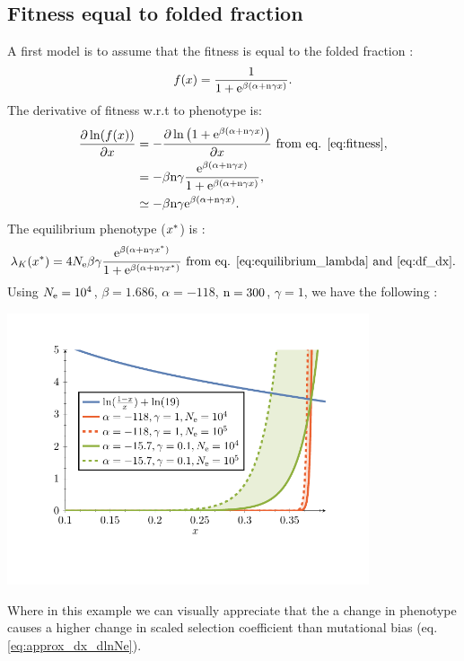 \documentclass{article}
\begin{document}
\subsection{Fitness equal to folded fraction}
A first model is to assume that the fitness is equal to the folded fraction \cite{Goldstein2013}:
\begin{gather}
f(x) = \frac{1}{1 + \mathrm{e}^{\beta(\alpha + \text{n} \gamma x)}}. \label{eq:fitness}
\end{gather}
The derivative of fitness w.r.t to phenotype is:
\begin{align}
\frac{\partial \ln (f(x))}{\partial x}  & = - \frac{\partial \ln \left( 1 + \mathrm{e}^{\beta(\alpha + \text{n} \gamma x)} \right)}{\partial x} \text{ from eq. \ref{eq:fitness}}, \\
& = - \beta \text{n} \gamma \frac{\mathrm{e}^{\beta(\alpha + \text{n} \gamma x)}}{1 + \mathrm{e}^{\beta(\alpha + \text{n} \gamma x)}} \label{eq:df_dx},\\
& \simeq - \beta \text{n} \gamma \mathrm{e}^{\beta(\alpha + \text{n} \gamma x)}.
\end{align}
The equilibrium phenotype ($x^{*}$) is :
\begin{gather}
\lambda_{K}(x^{*}) = 4N_{\mathrm{e}} \beta \gamma \frac{\mathrm{e}^{\beta(\alpha + \text{n} \gamma x^{*})}}{1 + \mathrm{e}^{\beta(\alpha + \text{n} \gamma x^{*})}}  \text{ from eq. \ref{eq:equilibrium_lambda} and \ref{eq:df_dx}}.
\end{gather}
Using $N_{\mathrm{e}}=10^4$, $\beta=1.686$, $\alpha = -118$, $\text{n}=300$, $\gamma=1$, we have the following :
\begin{center}
\includegraphics[width=0.8\textwidth, page=4] {figures.pdf}
\end{center}
Where in this example we can visually appreciate that the a change in phenotype causes a higher change in scaled selection coefficient than mutational bias (eq. \ref{eq:approx_dx_dlnNe}).
\end{document}
